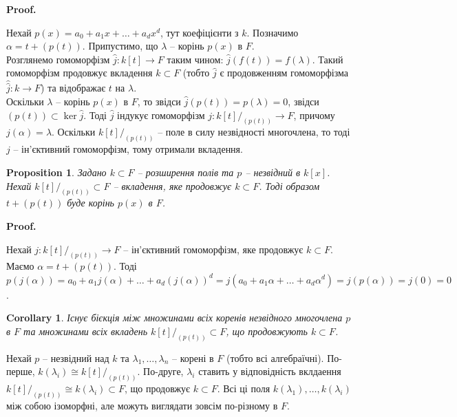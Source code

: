 \documentclass[a4paper, 10pt]{article}
\makeatletter
\theoremstyle{theoremdd}
\theoremstyle{theoremdd}
\theoremstyle{theoremdd}
\theoremstyle{theoremdd}
\theoremstyle{theoremdd}
\theoremstyle{theoremdd}
\theoremstyle{theoremdd}
\theoremstyle{theoremdd}
\theoremstyle{theoremdd}
\newtheorem{proposition}[theorem]{Proposition}
\theoremstyle{theoremdd}
\theoremstyle{theoremdd}
\theoremstyle{theoremdd}
\theoremstyle{theoremdd}
\theoremstyle{theoremdd}
\newtheorem{corollary}[theorem]{Corollary}
\theoremstyle{theoremdd}
\renewenvironment{proof}[1][Proof.\\]{\par
\pushQED{\hfill \qed}%
\normalfont \topsep6\p@\@plus6\p@\relax
\trivlist
\item\relax
{\bfseries
#1\@addpunct{.}}\hspace\labelsep\ignorespaces
}{%
\popQED\endtrivlist\@endpefalse
}
\makeatother
\begin{document}
\begin{proof}
Нехай $p(x) = a_0 + a_1 x + \dots + a_d x^d$, тут коефіцієнти з $k$. Позначимо $\alpha = t + (p(t))$. Припустимо, що $\lambda$ -- корінь $p(x)$ в $F$.\\
Розглянемо гомоморфізм $\hat{j} \colon k[t] \to F$ таким чином: $\hat{j}(f(t)) = f(\lambda)$. Такий гомоморфізм продовжує вкладення $k \subset F$ (тобто $\hat{j}$ є продовженням гомоморфізма $\hat{\hat{j}} \colon k \to F$) та відображає $t$ на $\lambda$.\\
\iffalse Розглянемо гомоморфізм $\hat{j} \colon k[t] \to F$, який продовжує вкладення $k \subset F$ (тобто $\hat{j}$ є продовженням $\hat{\hat{j}} \colon k \to F$) та відображає $t$ на корінь $\lambda$. Значить, $\hat{j}(f(t)) = f(\lambda)$. \fi Оскільки $\lambda$ -- корінь $p(x)$ в $F$, то звідси $\hat{j}(p(t)) = p(\lambda) = 0$, звідси $(p(t)) \subset \ker \hat{j}$. Тоді $\hat{j}$ індукує гомоморфізм $j \colon k[t]/_{(p(t))} \to F$, причому $j(\alpha) = \lambda$. Оскільки $k[t]/_{(p(t))}$ -- поле в силу незвідності многочлена, то тоді $j$ -- ін'єктивний гомоморфізм, тому отримали вкладення.
\end{proof}

\begin{proposition}
Задано $k \subset F$ -- розширення полів та $p$ -- незвідний в $k[x]$. Нехай $k[t]/_{(p(t))} \subset F$ -- вкладення, яке продовжує $k \subset F$. Тоді образом $t + (p(t))$ буде корінь $p(x)$ в $F$.
\end{proposition}

\begin{proof}
Нехай $j \colon k[t]/_{(p(t))} \to F$ -- ін'єктивний гомоморфізм, яке продовжує $k \subset F$. Маємо $\alpha = t + (p(t))$. Тоді\\
$p(j(\alpha)) = a_0 + a_1 j(\alpha) + \dots + a_d (j(\alpha))^d = j(a_0 + a_1 \alpha + \dots + a_d \alpha^d) = j(p(\alpha)) = j(0) = 0$.
\end{proof}

\begin{corollary}
Існує бієкція між множинами всіх коренів незвідного многочлена $p$ в $F$ та множинами всіх вкладень $k[t]/_{(p(t))} \subset F$, що продовжують $k \subset F$.
\end{corollary}

Нехай $p$ -- незвідний над $k$ та $\lambda_1,\dots,\lambda_n$ -- корені в $F$ (тобто всі алгебраїчні). По-перше, $k(\lambda_i) \cong k[t]/_{(p(t))}$. По-друге, $\lambda_i$ ставить у відповідність вклдаення $k[t]/_{(p(t))} \cong k(\lambda_i) \subset F$, що продовжує $k \subset F$. Всі ці поля $k(\lambda_1),\dots,k(\lambda_i)$ між собою ізоморфні, але можуть виглядати зовсім по-різному в $F$.
\end{document}

